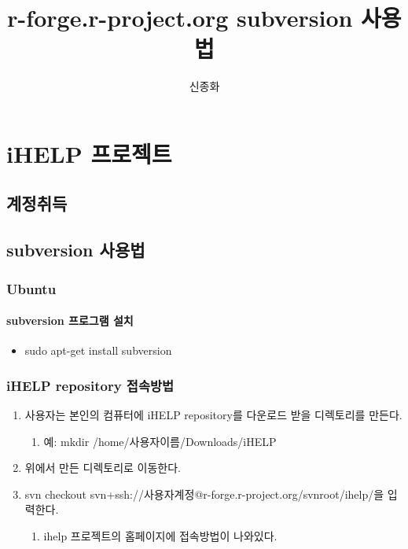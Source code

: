 \documentclass[,noae]{report}
\begin{document}
\title{r-forge.r-project.org subversion 사용법}


\author{신종화}

\maketitle

\part{iHELP 프로젝트}


\chapter{계정취득}


\chapter{subversion 사용법}


\section{Ubuntu}


\subsection{subversion 프로그램 설치}
\begin{itemize}
\item sudo apt-get install subversion
\end{itemize}

\section{iHELP repository 접속방법}
\begin{enumerate}
\item 사용자는 본인의 컴퓨터에 iHELP repository를 다운로드 받을 디렉토리를 만든다.

\begin{enumerate}
\item 예: mkdir /home/사용자이름/Downloads/iHELP
\end{enumerate}
\item 위에서 만든 디렉토리로 이동한다.
\item \textquotedbl{}svn checkout svn+ssh://사용자계정@r-forge.r-project.org/svnroot/ihelp/\textquotedbl{}을
입력한다. 

\begin{enumerate}
\item ihelp 프로젝트의 홈페이지에 접속방법이 나와있다.
\end{enumerate}
\end{enumerate}
\end{document}
